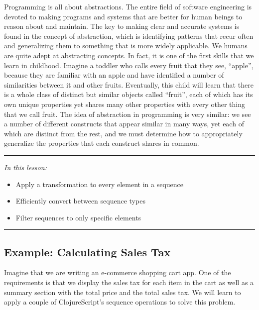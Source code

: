 \documentclass[10pt,twoside,openright]{memoir}
\begin{document}
Programming is all about abstractions. The entire field of software
engineering is devoted to making programs and systems that are better
for human beings to reason about and maintain. The key to making clear
and accurate systems is found in the concept of abstraction, which is
identifying patterns that recur often and generalizing them to something
that is more widely applicable. We humans are quite adept at abstracting
concepts. In fact, it is one of the first skills that we learn in
childhood. Imagine a toddler who calls every fruit that they see,
``apple'', because they are familiar with an apple and have identified a
number of similarities between it and other fruits. Eventually, this
child will learn that there is a whole class of distinct but similar
objects called ``fruit'', each of which has its own unique properties
yet shares many other properties with every other thing that we call
fruit. The idea of abstraction in programming is very similar: we see a
number of different constructs that appear similar in many ways, yet
each of which are distinct from the rest, and we must determine how to
appropriately generalize the properties that each construct shares in
common.

\begin{center}\rule{0.5\linewidth}{0.5pt}\end{center}

\emph{In this lesson:}

\begin{itemize}
\tightlist
\item
  Apply a transformation to every element in a sequence
\item
  Efficiently convert between sequence types
\item
  Filter sequences to only specific elements
\end{itemize}

\begin{center}\rule{0.5\linewidth}{0.5pt}\end{center}


\subsection{Example: Calculating Sales Tax}

Imagine that we are writing an e-commerce shopping cart app. One of the
requirements is that we display the sales tax for each item in the cart
as well as a summary section with the total price and the total sales
tax. We will learn to apply a couple of ClojureScript's sequence
operations to solve this problem.
\end{document}
